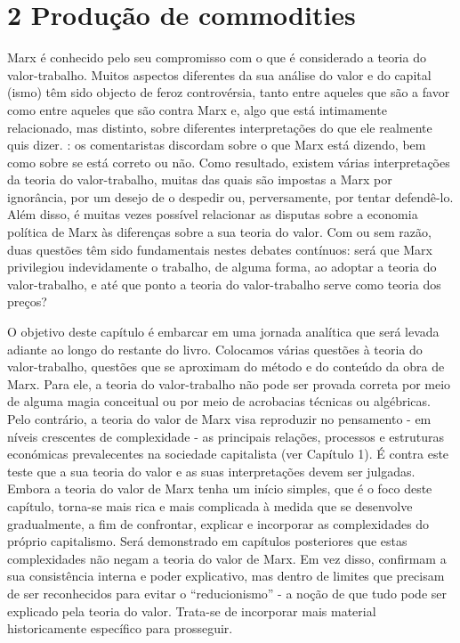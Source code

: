 \chapter{2 Produção de commodities}\label{2 Produção de commodities}
 \par 
Marx é conhecido pelo seu compromisso com o que é considerado a teoria do valor-trabalho. Muitos aspectos diferentes da sua análise do valor e do capital (ismo) têm sido objecto de feroz controvérsia, tanto entre aqueles que são a favor como entre aqueles que são contra Marx e, algo que está intimamente relacionado, mas distinto, sobre diferentes interpretações do que ele realmente quis dizer. : os comentaristas discordam sobre o que Marx está dizendo, bem como sobre se está correto ou não. Como resultado, existem várias interpretações da teoria do valor-trabalho, muitas das quais são impostas a Marx por ignorância, por um desejo de o despedir ou, perversamente, por tentar defendê-lo. Além disso, é muitas vezes possível relacionar as disputas sobre a economia política de Marx às diferenças sobre a sua teoria do valor. Com ou sem razão, duas questões têm sido fundamentais nestes debates contínuos: será que Marx privilegiou indevidamente o trabalho, de alguma forma, ao adoptar a teoria do valor-trabalho, e até que ponto a teoria do valor-trabalho serve como teoria dos preços?
 \par 
O objetivo deste capítulo é embarcar em uma jornada analítica que será levada adiante ao longo do restante do livro. Colocamos várias questões à teoria do valor-trabalho, questões que se aproximam do método e do conteúdo da obra de Marx. Para ele, a teoria do valor-trabalho não pode ser provada correta por meio de alguma magia conceitual ou por meio de acrobacias técnicas ou algébricas. Pelo contrário, a teoria do valor de Marx visa reproduzir no pensamento - em níveis crescentes de complexidade - as principais relações, processos e estruturas económicas prevalecentes na sociedade capitalista (ver Capítulo {\color{blue}1}). É contra este teste que a sua teoria do valor e as suas interpretações devem ser julgadas. Embora a teoria do valor de Marx tenha um início simples, que é o foco deste capítulo, torna-se mais rica e mais complicada à medida que se desenvolve gradualmente, a fim de confrontar, explicar e incorporar as complexidades do próprio capitalismo. Será demonstrado em capítulos posteriores que estas complexidades não negam a teoria do valor de Marx. Em vez disso, confirmam a sua consistência interna e poder explicativo, mas dentro de limites que precisam de ser reconhecidos para evitar o “reducionismo” - a noção de que tudo pode ser explicado pela teoria do valor. Trata-se de incorporar mais material historicamente específico para prosseguir.
